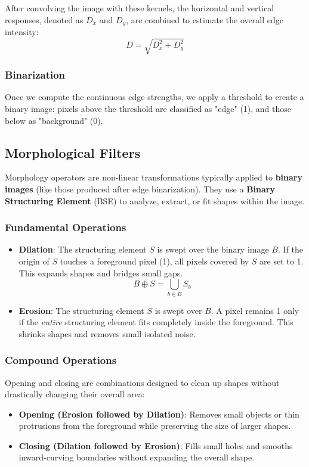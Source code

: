 After convolving the image with these kernels, the horizontal and vertical responses, denoted as $D_x$ and $D_y$, are combined to estimate the overall edge intensity:
\begin{equation}
    D
    =
    \sqrt{D_x^2 + D_y^2}
\end{equation}
\subsubsection*{Binarization}
Once we compute the continuous edge strengths, we apply a threshold to create a binary image: pixels above the threshold are classified as "edge" (1), and those below as "background" (0).

\subsection{Morphological Filters}
Morphology operators are non-linear transformations typically applied to \textbf{binary images} (like those produced after edge binarization). They use a \textbf{Binary Structuring Element} (BSE) to analyze, extract, or fit shapes within the image.

\subsubsection{Fundamental Operations}
\begin{itemize}
    \item \textbf{Dilation}: The structuring element $S$ is swept over the binary image $B$. If the origin of $S$ touches a foreground pixel (1), all pixels covered by $S$ are set to 1. This expands shapes and bridges small gaps.
    \begin{equation}
        B \oplus S = \bigcup_{b \in B} S_b
    \end{equation}
    \item \textbf{Erosion}: The structuring element $S$ is swept over $B$. A pixel remains 1 only if the \textit{entire} structuring element fits completely inside the foreground. This shrinks shapes and removes small isolated noise.
\end{itemize}

\subsubsection{Compound Operations}
Opening and closing are combinations designed to clean up shapes without drastically changing their overall area:
\begin{itemize}
    \item \textbf{Opening (Erosion followed by Dilation)}: Removes small objects or thin protrusions from the foreground while preserving the size of larger shapes.
    \item \textbf{Closing (Dilation followed by Erosion)}: Fills small holes and smooths inward-curving boundaries without expanding the overall shape.
\end{itemize}